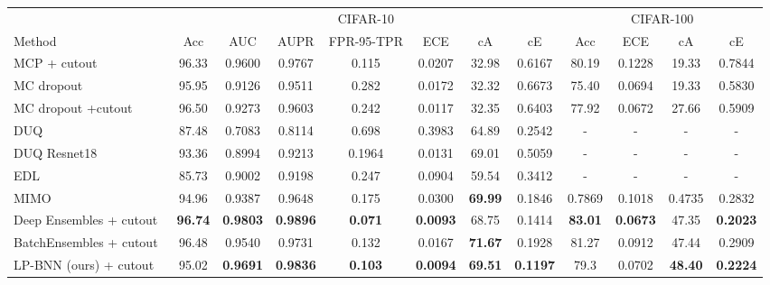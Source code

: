 \documentclass[10pt,twocolumn,letterpaper]{article}
\begin{document}
\begin{table*}[!t]
\renewcommand{\figurename}{Table}
\renewcommand{\captionfont}{\small}
\begin{center}
\scalebox{0.65}
{
\begin{tabular}{l|ccccccc|cccc}
\toprule
 &   \multicolumn{7}{c|}{CIFAR-10}   &  \multicolumn{4}{c}{CIFAR-100}        \\ 
Method                  & Acc    & AUC   & AUPR    & FPR-95-TPR    & ECE     & cA    & cE       &  Acc    & ECE      & cA    & cE      \\ 
\midrule
MCP + cutout~\cite{hendrycks2016baseline}            & 96.33 & 0.9600 & 0.9767 & 0.115 &0.0207 & 32.98 & 0.6167  & 80.19 & 0.1228 & 19.33 & 0.7844 \\ 
\midrule
MC dropout~\cite{gal2016dropout}              & 95.95 & 0.9126 & 0.9511 & 0.282 & 0.0172 & 32.32 & 0.6673  & 75.40 & 0.0694 & 19.33 & 0.5830 \\ 
\midrule
MC dropout +cutout~\cite{gal2016dropout}     & 96.50 & 0.9273 & 0.9603 & 0.242 & 0.0117 & 32.35 & 0.6403  & 77.92 & 0.0672 & 27.66 & 0.5909 \\ 
\midrule
DUQ~\cite{van2020uncertainty}  & 87.48 & 0.7083 & 0.8114 & 0.698 & 0.3983 & 64.89 & 0.2542  & - & - & - & - \\
\midrule 
DUQ Resnet18~\cite{van2020uncertainty}  & 93.36 & 0.8994 & 0.9213 & 0.1964& 0.0131 & 69.01 & 0.5059  & - & - & - & - \\ 
\midrule 
EDL~\cite{sensoy2018evidential}  & 85.73 & 0.9002 & 0.9198 & 0.247 & 0.0904 & 59.54 & 0.3412  & - & - & - & - \\ 
\midrule
MIMO~\cite{havasi2020training} & 94.96 & 0.9387 & 0.9648 & 0.175 & 0.0300 & \textbf{69.99} & 0.1846  & 0.7869 & 0.1018 & 0.4735 & 0.2832 \\ 
\midrule
Deep Ensembles + cutout~\cite{lakshminarayanan2017simple} & \textbf{96.74} & \textbf{0.9803} & \textbf{0.9896} & \textbf{0.071} & \textbf{0.0093} & 68.75 & 0.1414  & \textbf{83.01} & \textbf{0.0673} & 47.35 & \textbf{0.2023} \\ 
\midrule
BatchEnsembles  + cutout~\cite{wen2020batchensemble}   & 96.48 & 0.9540 & 0.9731 & 0.132 & 0.0167 & \textbf{71.67} & 0.1928  & 81.27 & 0.0912 & 47.44 & 0.2909 \\ \midrule
LP-BNN (ours) + cutout        & 95.02 & \textbf{0.9691} & \textbf{0.9836} & \textbf{0.103} & \textbf{0.0094} & \textbf{69.51} &\textbf{ 0.1197}  & 79.3 & 0.0702 & \textbf{48.40} & \textbf{0.2224} \\ 
\bottomrule

\end{tabular}}
\end{center}
\end{table*}
\end{document}
